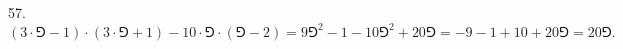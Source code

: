 57. $(3\cdot\Game-1)\cdot(3\cdot\Game+1)-10\cdot\Game\cdot(\Game-2)=9\Game^2-1-10\Game^2+20\Game=-9-1+10+20\Game=20\Game.$\\
